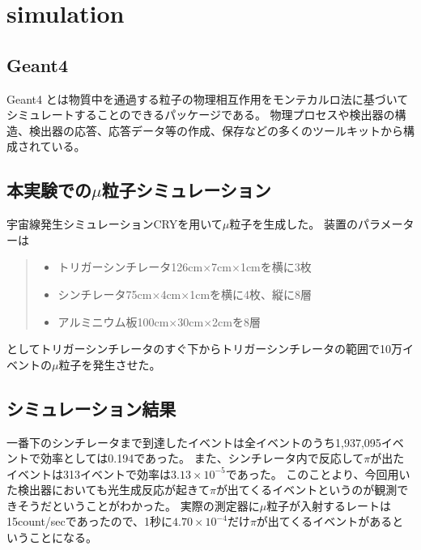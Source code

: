 \chapter{simulation}\label{simulation}
\section{Geant4}
Geant4 とは物質中を通過する粒子の物理相互作用をモンテカルロ法に基づいてシミュレートすることのできるパッケージである。
物理プロセスや検出器の構造、検出器の応答、応答データ等の作成、保存などの多くのツールキットから構成されている。

\section{本実験での$\mu$粒子シミュレーション}
宇宙線発生シミュレーションCRYを用いて$\mu$粒子を生成した。
装置のパラメーターは
    \begin{quote}
        \begin{itemize}
            \item トリガーシンチレータ126cm$\times$7cm$\times$1cmを横に3枚
            \item シンチレータ75cm$\times$4cm$\times$1cmを横に4枚、縦に8層
            \item アルミニウム板100cm$\times$30cm$\times$2cmを8層
        \end{itemize}
    \end{quote}
としてトリガーシンチレータのすぐ下からトリガーシンチレータの範囲で10万イベントの$\mu$粒子を発生させた。

\section{シミュレーション結果}
一番下のシンチレータまで到達したイベントは全イベントのうち1,937,095イベントで効率としては0.194であった。
また、シンチレータ内で反応して$\pi$が出たイベントは313イベントで効率は$3.13 \times10^{-5}$であった。
このことより、今回用いた検出器においても光生成反応が起きて$\pi$が出てくるイベントというのが観測できそうだということがわかった。
実際の測定器に$\mu$粒子が入射するレートは15count/secであったので、1秒に$4.70 \times10^{-4}$だけ$\pi$が出てくるイベントがあるということになる。

        
